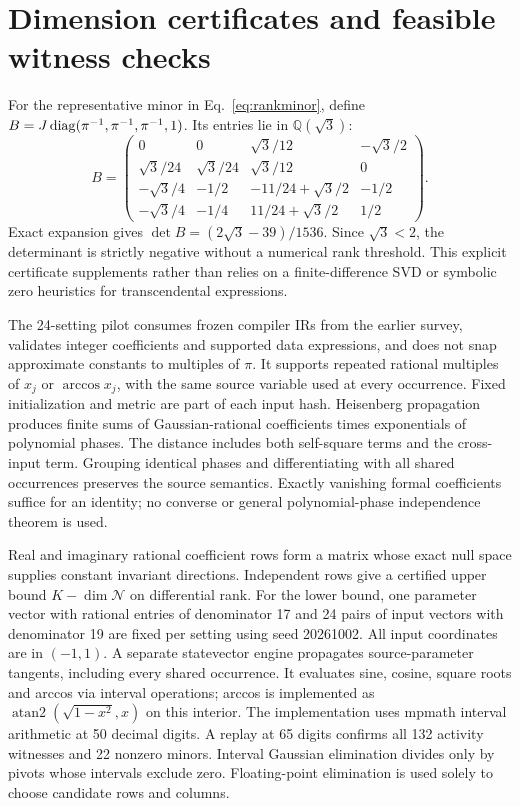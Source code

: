 \section{Dimension certificates and feasible witness checks}
\label{app:dimension}
For the representative minor in Eq.~\eqref{eq:rankminor}, define
$B=J\operatorname{diag}(\pi^{-1},\pi^{-1},\pi^{-1},1)$. Its entries lie in
$\mathbb Q(\sqrt3)$:
\begin{equation}
 B=\begin{pmatrix}
 0&0&\sqrt3/12&-\sqrt3/2\\
 \sqrt3/24&\sqrt3/24&\sqrt3/12&0\\
 -\sqrt3/4&-1/2&-11/24+\sqrt3/2&-1/2\\
 -\sqrt3/4&-1/4&11/24+\sqrt3/2&1/2
 \end{pmatrix}.
\end{equation}
Exact expansion gives $\det B=(2\sqrt3-39)/1536$. Since $\sqrt3<2$,
the determinant is strictly negative without a numerical rank threshold.
This explicit certificate supplements rather than relies on a
finite-difference SVD or symbolic zero heuristics for transcendental
expressions.

The 24-setting pilot consumes frozen compiler IRs from the earlier
survey, validates integer coefficients and supported data expressions,
and does not snap approximate constants to multiples of $\pi$.
It supports repeated rational multiples of $x_j$ or $\arccos x_j$,
with the same source variable used at every occurrence. Fixed
initialization and metric are part of each input hash.
Heisenberg propagation produces finite sums of
Gaussian-rational coefficients times exponentials of polynomial phases.
The distance includes both self-square terms and the cross-input term.
Grouping identical phases and differentiating with all shared
occurrences preserves the source semantics. Exactly vanishing formal
coefficients suffice for an identity; no converse or general
polynomial-phase independence theorem is used.

Real and imaginary rational coefficient rows form a matrix whose exact
null space supplies constant invariant directions. Independent rows
give a certified upper bound $K-\dim\mathcal N$ on differential rank.
For the lower bound, one parameter vector with rational entries of
denominator 17 and 24 pairs of input vectors with denominator 19 are
fixed per setting using seed 20261002. All input coordinates are in
$(-1,1)$. A separate statevector engine propagates source-parameter
tangents, including every shared occurrence. It evaluates sine,
cosine, square roots and arccos via interval operations; arccos is
implemented as $\operatorname{atan2}(\sqrt{1-x^2},x)$ on this interior.
The implementation uses mpmath interval arithmetic at 50 decimal
digits. A replay at 65 digits confirms all 132 activity witnesses and
22 nonzero minors. Interval Gaussian elimination divides only by
pivots whose intervals exclude zero. Floating-point elimination is
used solely to choose candidate rows and columns.

